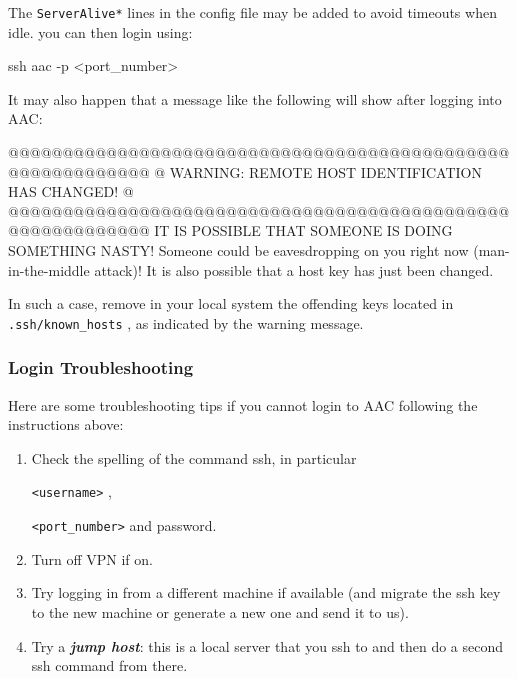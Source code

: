 \documentclass[
]{article}
\providecommand{\tightlist}{%
  \setlength{\itemsep}{0pt}\setlength{\parskip}{0pt}}
\let\oldtexttt\texttt
\renewcommand{\texttt}[1]{
  \colorbox{Light}{\oldtexttt{#1}}
}
\newenvironment{Shaded}{}{}
\newcommand{\ExtensionTok}[1]{#1}
\newcommand{\FunctionTok}[1]{\textcolor[rgb]{0.02,0.16,0.49}{#1}}
\newcommand{\NormalTok}[1]{#1}
\newcommand{\OperatorTok}[1]{\textcolor[rgb]{0.40,0.40,0.40}{#1}}
\providecommand{\tightlist}{%
  \setlength{\itemsep}{0pt}\setlength{\parskip}{0pt}}
\begin{document}
The \texttt{ServerAlive*} lines in the config file may be added to avoid
timeouts when idle. you can then login using:

\begin{Shaded}
\begin{Highlighting}[]
\FunctionTok{ssh}\NormalTok{ aac {-}p }\OperatorTok{\textless{}}\NormalTok{port\_number}\OperatorTok{\textgreater{}}
\end{Highlighting}
\end{Shaded}

It may also happen that a message like the following will show after
logging into AAC:

\begin{Shaded}
\begin{Highlighting}[]
\ExtensionTok{@@@@@@@@@@@@@@@@@@@@@@@@@@@@@@@@@@@@@@@@@@@@@@@@@@@@@@@@@@@}
\ExtensionTok{@}\NormalTok{    WARNING: REMOTE HOST IDENTIFICATION HAS CHANGED!     @}
\ExtensionTok{@@@@@@@@@@@@@@@@@@@@@@@@@@@@@@@@@@@@@@@@@@@@@@@@@@@@@@@@@@@}
\ExtensionTok{IT}\NormalTok{ IS POSSIBLE THAT SOMEONE IS DOING SOMETHING NASTY!}
\ExtensionTok{Someone}\NormalTok{ could be eavesdropping on you right now (man{-}in{-}the{-}middle attack)!}
\ExtensionTok{It}\NormalTok{ is also possible that a host key has just been changed.}
\end{Highlighting}
\end{Shaded}

In such a case, remove in your local system the offending keys located
in \texttt{.ssh/known\_hosts}, as indicated by the warning message.

\hypertarget{login-troubleshooting}{%
\subsubsection{Login Troubleshooting}\label{login-troubleshooting}}

Here are some troubleshooting tips if you cannot login to AAC following
the instructions above:

\begin{enumerate}
\def\labelenumi{\arabic{enumi}.}
\tightlist
\item
  Check the spelling of the command ssh, in particular
  \texttt{\textless{}username\textgreater{}},
  \texttt{\textless{}port\_number\textgreater{}} and password.
\item
  Turn off VPN if on.
\item
  Try logging in from a different machine if available (and migrate the
  ssh key to the new machine or generate a new one and send it to us).
\item
  Try a \textbf{\emph{jump host}}: this is a local server that you ssh
  to and then do a second ssh command from there.
\end{enumerate}
\end{document}
